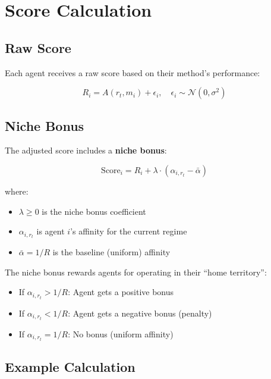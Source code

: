 \documentclass[11pt,a4paper]{article}
\theoremstyle{definition}
\theoremstyle{plain}
\newcommand{\N}{\mathcal{N}}
\begin{document}
\section{Score Calculation}

\subsection{Raw Score}

Each agent receives a raw score based on their method's performance:

\begin{equation}
R_i = A(r_t, m_i) + \epsilon_i, \quad \epsilon_i \sim \N(0, \sigma^2)
\end{equation}

\subsection{Niche Bonus}

The adjusted score includes a \textbf{niche bonus}:

\begin{equation}
\boxed{\text{Score}_i = R_i + \lambda \cdot (\alpha_{i,r_t} - \bar{\alpha})}
\end{equation}

where:
\begin{itemize}
    \item $\lambda \geq 0$ is the niche bonus coefficient
    \item $\alpha_{i,r_t}$ is agent $i$'s affinity for the current regime
    \item $\bar{\alpha} = 1/R$ is the baseline (uniform) affinity
\end{itemize}

\begin{keypoint}
The niche bonus rewards agents for operating in their ``home territory'':
\begin{itemize}
    \item If $\alpha_{i,r_t} > 1/R$: Agent gets a positive bonus
    \item If $\alpha_{i,r_t} < 1/R$: Agent gets a negative bonus (penalty)
    \item If $\alpha_{i,r_t} = 1/R$: No bonus (uniform affinity)
\end{itemize}
\end{keypoint}

\subsection{Example Calculation}
\end{document}
